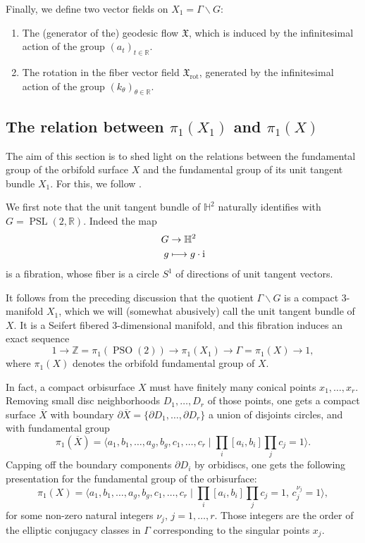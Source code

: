 \documentclass[JEP,XML,SOM,Unicode,NoFloatCountersInSection,published]{cedram}
\newcommand\mto{\mathchoice{\longmapsto}{\mapsto}{\mapsto}{\mapsto}}
\theoremstyle{plain}
\theoremstyle{definition}
\theoremstyle{remark}
\newcommand{\R}{\mathbb{R}}
\newcommand{\Z}{\mathbb{Z}}
\renewcommand{\H}{\mathbb{H}}
\newcommand{\rot}{\mathrm{rot}}
\DeclareMathOperator{\PSL}{PSL}
\DeclareMathOperator{\PSO}{PSO}
\numberwithin{equation}{section}
\begin{document}
Finally, we define two vector fields on $X_1 = \Gamma \backslash G$:
\begin{enumerate}
\item The (generator of the) geodesic flow $\mathfrak X$, which is induced by the infinitesimal action of the group $(a_t)_{t \in \R}$.
\item The rotation in the fiber vector field $\mathfrak X_\rot$, generated by the infinitesimal action of the group $(k_\theta)_{\theta \in \R}$.
\end{enumerate}
\subsection{The relation between $\pi_1(X_1)$ and $\pi_1(X)$}
\label{subsec:Unit}
The aim of this section is to shed light on the relations between the fundamental group of the orbifold surface $X$ and the fundamental group of its unit tangent bundle $X_1$. For this, we follow \cite[\S 2]{fried1986fuchsian}.

We first note that the unit tangent bundle of $\H^2$ naturally identifies with $G=\PSL(2,\R)$. Indeed the map
\begin{align*}
G &\to \H^2\\
g &\mto g\cdot \textrm i
\end{align*}
is a fibration, whose fiber is a circle $S^1$ of directions of unit tangent vectors.

It follows from the preceding discussion that the quotient $\Gamma \backslash G$ is a compact 3\nobreakdash-manifold $X_1$, which we will (somewhat abusively) call the unit tangent bundle of~$X$. It is a Seifert fibered 3\nobreakdash-dimensional manifold, and this fibration induces an exact sequence
\[
1 \to \Z = \pi_1(\PSO(2)) \to \pi_1(X_1) \to \Gamma= \pi_1(X) \to 1,
\]
where $\pi_1(X)$ denotes the orbifold fundamental group of $X$.

In fact, a compact orbisurface $X$ must have finitely many conical points $x_1, \ldots, x_r$. Removing small disc neighborhoods $D_1, \ldots, D_r$ of those points, one gets a compact surface $\overline X$ with boundary $\partial \overline X=\{\partial D_1, \ldots, \partial D_r\}$ a union of disjoints circles, and with fundamental group
\[\textstyle
\pi_1(\overline X)= \bigl\langle a_1, b_1, \ldots, a_g, b_g, c_1, \ldots, c_r \mid \prod_i[a_i,b_i]\prod_j c_j = 1 \bigr\rangle.
\]
Capping off the boundary components $\partial D_i$ by orbidiscs, one gets the following presentation for the fundamental group of the orbisurface:
\[\textstyle
\pi_1(X)= \bigl\langle a_1, b_1, \ldots, a_g, b_g, c_1, \ldots, c_r \mid \prod_i[a_i,b_i]\prod_j c_j = 1, \, c_j^{\nu_j}=1 \bigr\rangle,
\]
for some non-zero natural integers $\nu_j, \, j= 1, \ldots, r$. Those integers are the order of the elliptic conjugacy classes in $\Gamma$ corresponding to the singular points $x_j$.
\end{document}
